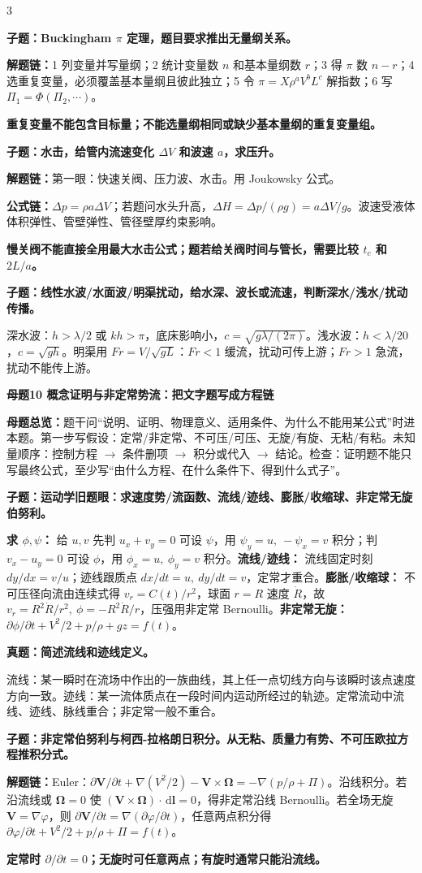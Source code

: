 \documentclass[a4paper]{article}
\newcommand{\mt}[1]{\vspace{0.12pt}\colorbox{M}{\parbox{\dimexpr\linewidth-2\fboxsep}{\color{white}\bfseries #1}}\par}
\newcommand{\qt}[1]{\vspace{0.04pt}\colorbox{Q}{\parbox{\dimexpr\linewidth-2\fboxsep}{\color{white}\bfseries #1}}\par}
\newcommand{\ans}[1]{\colorbox{G}{\parbox{\dimexpr\linewidth-2\fboxsep}{#1}}\par}
\newcommand{\warn}[1]{\colorbox{Y}{\parbox{\dimexpr\linewidth-2\fboxsep}{\color{E}\bfseries #1}}\par}
\newcommand{\chain}[1]{{\color{A}\bfseries 解题链：}#1\par}
\newcommand{\form}[1]{{\color{M}\bfseries 公式链：}#1\par}
\newcommand{\dd}{\,\mathrm d}
\newcommand{\mview}[1]{\ans{\textbf{母题总览：}#1}}
\begin{document}
\begin{multicols}{3}
\qt{子题：Buckingham $\pi$ 定理，题目要求推出无量纲关系。}
\chain{1 列变量并写量纲；2 统计变量数 $n$ 和基本量纲数 $r$；3 得 $\pi$ 数 $n-r$；4 选重复变量，必须覆盖基本量纲且彼此独立；5 令 $\pi=X\rho^aV^bL^c$ 解指数；6 写 $\Pi_1=\Phi(\Pi_2,\cdots)$。}
\warn{重复变量不能包含目标量；不能选量纲相同或缺少基本量纲的重复变量组。}

\qt{子题：水击，给管内流速变化 $\Delta V$ 和波速 $a$，求压升。}
\chain{第一眼：快速关阀、压力波、水击。用 Joukowsky 公式。}
\form{$\Delta p=\rho a\Delta V$；若题问水头升高，$\Delta H=\Delta p/(\rho g)=a\Delta V/g$。波速受液体体积弹性、管壁弹性、管径壁厚约束影响。}
\warn{慢关阀不能直接全用最大水击公式；题若给关阀时间与管长，需要比较 $t_c$ 和 $2L/a$。}

\qt{子题：线性水波/水面波/明渠扰动，给水深、波长或流速，判断深水/浅水/扰动传播。}
\ans{深水波：$h>\lambda/2$ 或 $kh>\pi$，底床影响小，$c=\sqrt{g\lambda/(2\pi)}$。浅水波：$h<\lambda/20$，$c=\sqrt{gh}$。明渠用 $Fr=V/\sqrt{gL}$：$Fr<1$ 缓流，扰动可传上游；$Fr>1$ 急流，扰动不能传上游。}


\mt{母题10 概念证明与非定常势流：把文字题写成方程链}
\mview{题干问“说明、证明、物理意义、适用条件、为什么不能用某公式”时进本题。第一步写假设：定常/非定常、不可压/可压、无旋/有旋、无粘/有粘。未知量顺序：控制方程 $\to$ 条件删项 $\to$ 积分或代入 $\to$ 结论。检查：证明题不能只写最终公式，至少写“由什么方程、在什么条件下、得到什么式子”。}
\qt{子题：运动学旧题眼：求速度势/流函数、流线/迹线、膨胀/收缩球、非定常无旋伯努利。}
\ans{\textbf{求 $\phi,\psi$：} 给 $u,v$ 先判 $u_x+v_y=0$ 可设 $\psi$，用 $\psi_y=u,\ -\psi_x=v$ 积分；判 $v_x-u_y=0$ 可设 $\phi$，用 $\phi_x=u,\ \phi_y=v$ 积分。\textbf{流线/迹线：} 流线固定时刻 $dy/dx=v/u$；迹线跟质点 $dx/dt=u,\ dy/dt=v$，定常才重合。\textbf{膨胀/收缩球：} 不可压径向流由连续式得 $v_r=C(t)/r^2$，球面 $r=R$ 速度 $\dot R$，故 $v_r=R^2\dot R/r^2,\ \phi=-R^2\dot R/r$，压强用非定常 Bernoulli。\textbf{非定常无旋：} $\partial\phi/\partial t+V^2/2+p/\rho+gz=f(t)$。}
\qt{真题：简述流线和迹线定义。}
\ans{流线：某一瞬时在流场中作出的一族曲线，其上任一点切线方向与该瞬时该点速度方向一致。迹线：某一流体质点在一段时间内运动所经过的轨迹。定常流动中流线、迹线、脉线重合；非定常一般不重合。}

\qt{子题：非定常伯努利与柯西-拉格朗日积分。从无粘、质量力有势、不可压欧拉方程推积分式。}
\chain{Euler：$\partial\bm V/\partial t+\nabla(V^2/2)-\bm V\times\bm\Omega=-\nabla(p/\rho+\Pi)$。沿线积分。若沿流线或 $\bm\Omega=0$ 使 $(\bm V\times\bm\Omega)\cdot\dd\bm l=0$，得非定常沿线 Bernoulli。若全场无旋 $\bm V=\nabla\varphi$，则 $\partial\bm V/\partial t=\nabla(\partial\varphi/\partial t)$，任意两点积分得 $\partial\varphi/\partial t+V^2/2+p/\rho+\Pi=f(t)$。}
\warn{定常时 $\partial/\partial t=0$；无旋时可任意两点；有旋时通常只能沿流线。}


\end{multicols}
\end{document}
